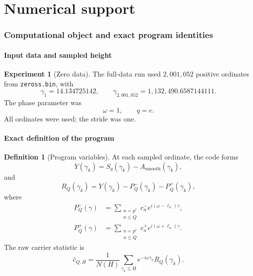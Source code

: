 \documentclass[11pt]{amsart}
\numberwithin{equation}{section}
\theoremstyle{plain}
\theoremstyle{definition}
\newtheorem{definition}[theorem]{Definition}
\newtheorem{experiment}[theorem]{Experiment}
\theoremstyle{remark}
\newcommand{\1}{\mathbf{1}}
\begin{document}
\part{Numerical support}

\section{Computational object and exact program identities}
\label{sec:numerical_program}

\subsection{Input data and sampled height}
\label{subsec:numerical_input_data}

\begin{experiment}[Zero data]
\label{exp:numerical_zero_data}
The full-data run used $2{,}001{,}052$ positive ordinates from
\texttt{zeross.bin}, with
\begin{equation}
\gamma_1=14.134725142,
\qquad
\gamma_{2{,}001{,}052}=1{,}132{,}490.6587144111.
\label{eq:numerical_zero_endpoints_detailed}
\end{equation}
The phase parameter was
\begin{equation}
\omega=1,
\qquad q=e.
\label{eq:numerical_omega}
\end{equation}
All ordinates were used; the stride was one.
\end{experiment}

\subsection{Exact definition of the program}
\label{subsec:exact_program_definition}

\begin{definition}[Program variables]
\label{def:numerical_program_variables}
At each sampled ordinate, the code forms
\begin{equation}
Y(\gamma_k)
=
S_q(\gamma_k)-A_{\mathrm{smooth}}(\gamma_k),
\label{eq:numerical_Y_program}
\end{equation}
and
\begin{equation}
R_Q(\gamma_k)
=
Y(\gamma_k)-P_Q^-(\gamma_k)-P_Q^+(\gamma_k),
\label{eq:numerical_RQ_program}
\end{equation}
where
\begin{align}
P_Q^-(\gamma)
&=
\sum_{\substack{n=p^r\\n\leq Q}}
 c_n^-e^{i(\omega-\ell_n)\gamma},
\label{eq:numerical_PQ_minus}
\\
P_Q^+(\gamma)
&=
\sum_{\substack{n=p^r\\n\leq Q}}
 c_n^+e^{i(\omega+\ell_n)\gamma}.
\label{eq:numerical_PQ_plus}
\end{align}
The raw carrier statistic is
\begin{equation}
\widehat c_{Q,H}
=
\frac1{N(H)}
\sum_{\gamma_k\leq H}
e^{-i\omega\gamma_k}R_Q(\gamma_k).
\label{eq:numerical_raw_carrier}
\end{equation}
\end{definition}
\end{document}
